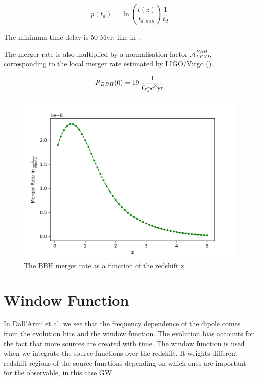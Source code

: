\begin{equation}
    p(t_d)=\ln\left(\frac{t(z)}{t_{d, min}}\right)\frac{1}{t_d}
\end{equation}

The minimum time delay is 50 Myr, like in \cite{dallarmi_dipole_2022}. 

The merger rate is also multiplied by a normalisation factor $\mathcal{A}_{LIGO}^{BBH}$, corresponding to the local merger rate estimated by LIGO/Virgo (\cite{the_ligo_scientific_collaboration_population_2022}).

\begin{equation}
    R_{BBH}(0)=19 \; \frac{1}{\rm{Gpc}^3\rm{yr}}
\end{equation}

\begin{figure}
    \centering
    \includegraphics[width=0.9\linewidth]{Images/bbh_merger_rate.png}
    \caption{The BBH merger rate as a function of the redshift z.}
    \label{bbh_merger_rate}
\end{figure} 


\section{Window Function}
\label{window_fct_section}

In Dall'Armi et al. \cite{dallarmi_dipole_2022} we see that the frequency dependence 
of the dipole comes from the evolution bias and the window function. The evolution 
bias accounts for the fact that more sources are created with time. The window 
function is used when we integrate the source functions over the redshift. It weights different redshift regions of the source functions depending on which ones are important for the observable, in this case GW.


